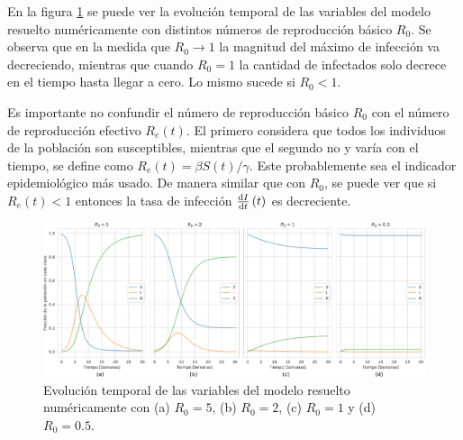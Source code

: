 En la figura \ref{fig:SIR_R} se puede ver la evolución temporal de las variables del modelo resuelto numéricamente con distintos 
números de reproducción básico $R_0$. Se observa que en la medida que $R_0 \to 1$ la magnitud del máximo de infección va decreciendo, mientras que cuando $R_0 = 1$ la 
cantidad de infectados solo decrece en el tiempo hasta llegar a cero. Lo mismo sucede si $R_0<1$.

Es importante no confundir el número de reproducción básico $R_0$ con el número de reproducción efectivo $R_e(t)$. El primero considera que todos los individuos de la 
población son susceptibles, mientras que el segundo no y varía con el tiempo, se define como $R_e(t)=\beta S(t)/\gamma$. Este probablemente sea el indicador epidemiológico 
más usado. De manera similar que con $R_0$, se puede ver que si $R_e(t) < 1$ entonces la tasa de infección $\dv{I}{t}\left(t\right)$ es decreciente.

\begin{figure}[t]
  \centering
  \includegraphics[width=\imsizeL]{SIR_R.png}
  \caption[Solución numérica del modelo S-I-R con distintos valores de $R_0$]{Evolución temporal de las variables del modelo resuelto numéricamente con (a) 
  $R_0 = 5$, (b) $R_0 = 2$, (c) $R_0 = 1$ y (d) $R_0 = 0.5$.}
  \label{fig:SIR_R}
\end{figure}

